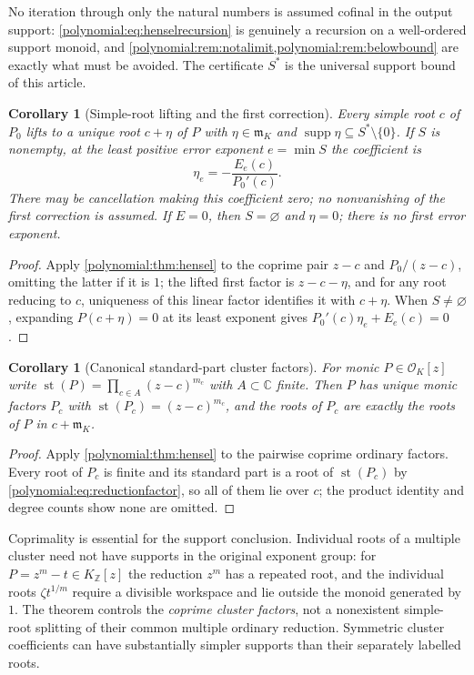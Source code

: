 \documentclass[11pt,letterpaper]{article}
\numberwithin{equation}{section}
\newtheorem{corollary}[theorem]{Corollary}
\theoremstyle{definition}
\theoremstyle{remark}\newtheorem{remark}[theorem]{Remark}
\newcommand{\C}{\mathbb C}
\newcommand{\Z}{\mathbb Z}
\newcommand{\OO}{\mathcal O}
\newcommand{\mm}{\mathfrak m}
\newcommand{\st}{\operatorname{st}}
\newcommand{\supp}{\operatorname{supp}}
\begin{document}
No iteration through only the natural numbers is assumed cofinal in the output
support: \eqref{polynomial:eq:henselrecursion} is genuinely a recursion on a
well-ordered support monoid, and
\cref{polynomial:rem:notalimit,polynomial:rem:belowbound} are exactly what
must be avoided. The certificate $S^*$ is the universal support bound of this
article.

\begin{corollary}[Simple-root lifting and the first correction]
\label{polynomial:cor:simpleroot}
Every simple root $c$ of $P_0$ lifts to a unique root $c+\eta$ of $P$ with
$\eta\in\mm_K$ and $\supp\eta\subseteq S^*\setminus\{0\}$. If $S$ is
nonempty, at the least positive error exponent $e=\min S$ the coefficient is
\begin{equation}\label{polynomial:eq:firstrootcorrection}
 \eta_e=-\frac{E_e(c)}{P_0'(c)} .
\end{equation}
There may be cancellation making this coefficient zero; no nonvanishing of the
first correction is assumed. If $E=0$, then $S=\varnothing$ and $\eta=0$;
there is no first error exponent.
\end{corollary}
\begin{proof}
Apply \cref{polynomial:thm:hensel} to the coprime pair $z-c$ and
$P_0/(z-c)$, omitting the latter if it is $1$; the lifted first factor is
$z-c-\eta$, and for any root reducing
to $c$, uniqueness of this linear factor identifies it with $c+\eta$.
When $S\ne\varnothing$, expanding $P(c+\eta)=0$ at its least exponent gives
$P_0'(c)\eta_e+E_e(c)=0$.
\end{proof}

\begin{corollary}[Canonical standard-part cluster factors]
\label{polynomial:cor:clusterfactor}
For monic $P\in\OO_K[z]$ write $\st(P)=\prod_{c\in A}(z-c)^{m_c}$ with
$A\subset\C$ finite. Then $P$ has unique monic factors $P_c$ with
$\st(P_c)=(z-c)^{m_c}$, and the roots of $P_c$ are exactly the roots of $P$ in
$c+\mm_K$.
\end{corollary}
\begin{proof}
Apply \cref{polynomial:thm:hensel} to the pairwise coprime ordinary factors.
Every root of $P_c$ is finite and its standard part is a root of $\st(P_c)$ by
\eqref{polynomial:eq:reductionfactor}, so all of them lie over $c$; the
product identity and degree counts show none are omitted.
\end{proof}

Coprimality is essential for the support conclusion. Individual roots of a
multiple cluster need not have supports in the original exponent group: for
$P=z^m-t\in K_\Z[z]$ the reduction $z^m$ has a repeated root, and the
individual roots $\zeta t^{1/m}$ require a divisible workspace and lie outside
the monoid generated by $1$. The theorem controls the \emph{coprime cluster
factors}, not a nonexistent simple-root splitting of their common multiple
ordinary reduction. Symmetric cluster coefficients can have substantially
simpler supports than their separately labelled roots.
\end{document}
